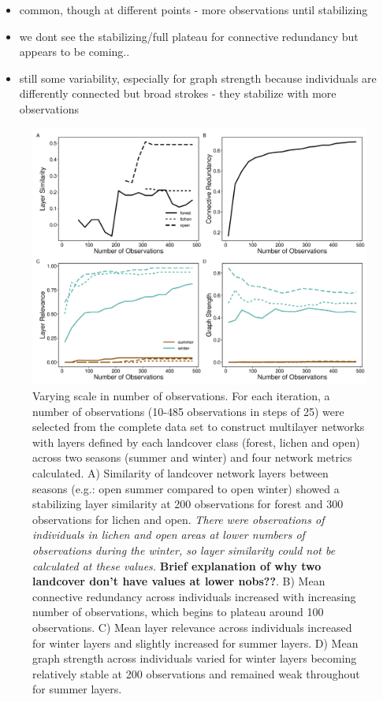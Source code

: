 \documentclass[]{article}
\providecommand{\tightlist}{%
  \setlength{\itemsep}{0pt}\setlength{\parskip}{0pt}}
\begin{document}
\begin{itemize}
\tightlist
\item
  common, though at different points - more observations until stabilizing
\item
  we dont see the stabilizing/full plateau for connective redundancy but appears to be coming..
\item
  still some variability, especially for graph strength because individuals are differently connected but broad strokes - they stabilize with more observations
\end{itemize}

\begin{figure}
\includegraphics[width=\linewidth]{../graphics/figure-nobs} \caption{Varying scale in number of observations. For each iteration, a number of observations (10-485 observations in steps of 25) were selected from the complete data set to construct multilayer networks with layers defined by each landcover class (forest, lichen and open) across two seasons (summer and winter) and four network metrics calculated. A) Similarity of landcover network layers between seasons (e.g.: open summer compared to open winter) showed a stabilizing layer similarity at 200 observations for forest and 300 observations for lichen and open. \emph{There were observations of individuals in lichen and open areas at lower numbers of observations during the winter, so layer similarity could not be calculated at these values.} \textbf{Brief explanation of why two landcover don't have values at lower nobs??}. B) Mean connective redundancy across individuals increased with increasing number of observations, which begins to plateau around 100 observations. C) Mean layer relevance across individuals increased for winter layers and slightly increased for summer layers. D) Mean graph strength across individuals varied for winter layers becoming relatively stable at 200 observations and remained weak throughout for summer layers.}\label{fig:unnamed-chunk-4}
\end{figure}
\end{document}
